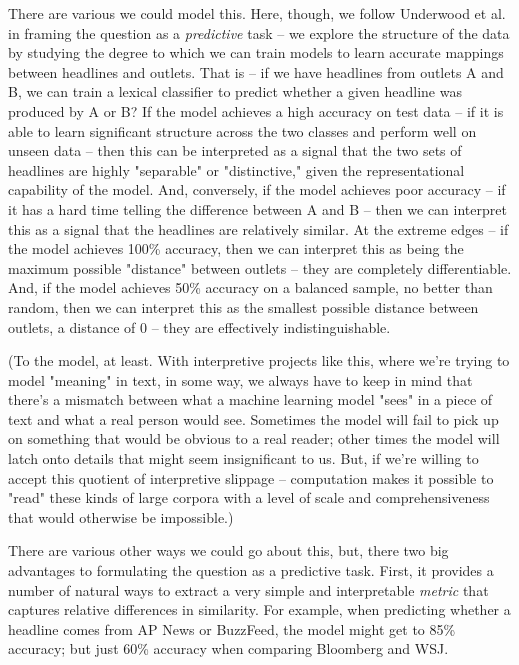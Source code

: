 \documentclass{scrartcl}
\begin{document}
There are various we could model this. Here, though, we follow Underwood et al.\cite{underwood2018transformation}\cite{underwood2018historical} in framing the question as a \textit{predictive} task -- we explore the structure of the data by studying the degree to which we can train models to learn accurate mappings between headlines and outlets. That is -- if we have headlines from outlets A and B, we can train a lexical classifier to predict whether a given headline was produced by A or B? If the model achieves a high accuracy on test data -- if it is able to learn significant structure across the two classes and perform well on unseen data -- then this can be interpreted as a signal that the two sets of headlines are highly "separable" or "distinctive," given the representational capability of the model. And, conversely, if the model achieves poor accuracy -- if it has a hard time telling the difference between A and B -- then we can interpret this as a signal that the headlines are relatively similar. At the extreme edges -- if the model achieves 100\% accuracy, then we can interpret this as being the maximum possible "distance" between outlets -- they are completely differentiable. And, if the model achieves 50\% accuracy on a balanced sample, no better than random, then we can interpret this as the smallest possible distance between outlets, a distance of 0 -- they are effectively indistinguishable.

(To the model, at least. With interpretive projects like this, where we're trying to model "meaning" in text, in some way, we always have to keep in mind that there's a mismatch between what a machine learning model "sees" in a piece of text and what a real person would see. Sometimes the model will fail to pick up on something that would be obvious to a real reader; other times the model will latch onto details that might seem insignificant to us. But, if we're willing to accept this quotient of interpretive slippage -- computation makes it possible to "read" these kinds of large corpora with a level of scale and comprehensiveness that would otherwise be impossible.)

There are various other ways we could go about this, but, there two big advantages to formulating the question as a predictive task. First, it provides a number of natural ways to extract a very simple and interpretable \textit{metric} that captures relative differences in similarity. For example, when predicting whether a headline comes from AP News or BuzzFeed, the model might get to 85\% accuracy; but just 60\% accuracy when comparing Bloomberg and WSJ.
\end{document}
